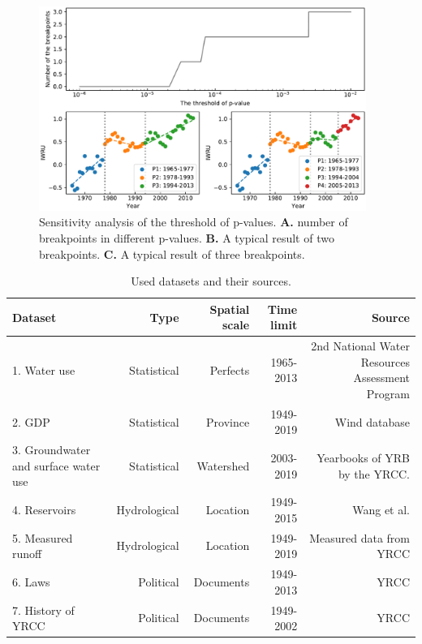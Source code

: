 \documentclass[9pt,twoside,lineno]{pnas-new}
\begin{document}


\begin{figure}
    \centering
    \includegraphics[width=0.95\textwidth]{../../figures/sup/sensitivity.pdf}
    \caption{
        Sensitivity analysis of the threshold of p-values. 
        \textbf{A.} number of breakpoints in different p-values.
        \textbf{B.} A typical result of two breakpoints.
        \textbf{C.} A typical result of three breakpoints.
    }
\end{figure}


\begin{table}\centering
    \caption{Used datasets and their sources.}
    
    \begin{tabular}{lrrrr}
    Dataset & Type & Spatial scale & Time limit & Source \\
    \midrule
    1. Water use & Statistical & Perfects & 1965-2013 & 2nd National Water Resources Assessment Program \\
    2. GDP & Statistical & Province & 1949-2019 & Wind database \\
    3. Groundwater and surface water use & Statistical & Watershed & 2003-2019 & Yearbooks of YRB by the YRCC. \\
    4. Reservoirs & Hydrological & Location & 1949-2015 & Wang et al. \cite{wangYellowRiverWater2019} \\
    5. Measured runoff & Hydrological & Location & 1949-2019 & Measured data from YRCC \\
    6. Laws & Political & Documents & 1949-2013 & YRCC \cite{yellowriverconservancycommissionYellowRiverBasin2013} \\
    7. History of YRCC & Political & Documents & 1949-2002 & YRCC \cite{ yellowriverarchivesOrganizationalHistoryYellow2004} \\
    \bottomrule
    \end{tabular}
\end{table}
\end{document}
